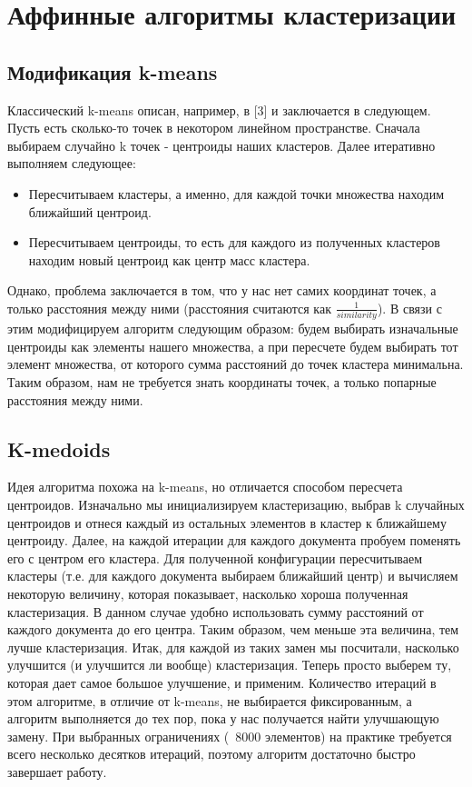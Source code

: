 \section{Аффинные алгоритмы кластеризации}
\subsection{Модификация k-means}
Классический k-means описан, например, в [3] и заключается в следующем. Пусть есть сколько-то точек в некотором линейном пространстве. Сначала выбираем случайно k точек - центроиды наших кластеров. Далее итеративно выполняем следующее:
\begin{itemize}
\item Пересчитываем кластеры, а именно, для каждой точки множества находим ближайший центроид.
\item Пересчитываем центроиды, то есть для каждого из полученных кластеров находим новый центроид как центр масс кластера.
\end{itemize}
Однако, проблема заключается в том, что у нас нет самих координат точек, а только расстояния между ними (расстояния считаются как $\frac{1}{similarity}$). В связи с этим модифицируем алгоритм следующим образом: будем выбирать изначальные центроиды как элементы нашего множества, а при пересчете будем выбирать тот элемент множества, от которого сумма расстояний до точек кластера минимальна. Таким образом, нам не требуется знать координаты точек, а только попарные расстояния между ними. \newline

\subsection{K-medoids}
Идея алгоритма похожа на k-means, но отличается способом пересчета центроидов. Изначально мы инициализируем кластеризацию, выбрав k случайных центроидов и отнеся каждый из остальных элементов в кластер к ближайшему центроиду. Далее, на каждой итерации для каждого документа пробуем поменять его с центром его кластера. Для полученной конфигурации пересчитываем кластеры (т.е. для каждого документа выбираем ближайший центр) и вычисляем некоторую величину, которая показывает, насколько хороша полученная кластеризация. В данном случае удобно использовать сумму расстояний от каждого документа до его центра. Таким образом, чем меньше эта величина, тем лучше кластеризация.
Итак, для каждой из таких замен мы посчитали, насколько улучшится (и улучшится ли вообще) кластеризация. Теперь просто выберем ту, которая дает самое большое улучшение, и применим. \newline
Количество итераций в этом алгоритме, в отличие от k-means, не выбирается фиксированным, а алгоритм выполняется до тех пор, пока у нас получается найти улучшающую замену. При выбранных ограничениях (~8000 элементов) на практике требуется всего несколько десятков итераций, поэтому алгоритм достаточно быстро завершает работу.

